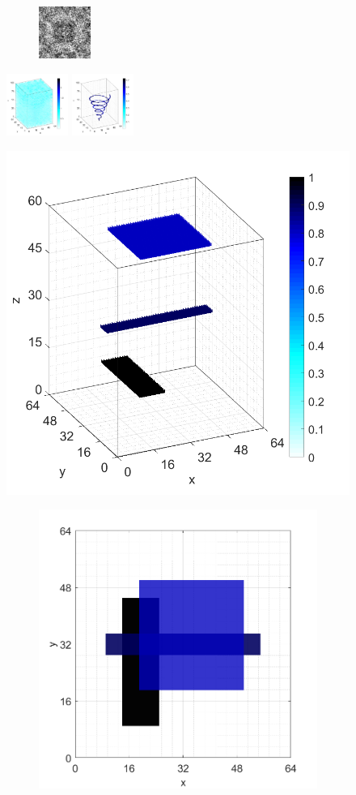 \documentclass[9pt,twocolumn,twoside]{osajnl}
\begin{document}
\begin{figure}[htbp]
\begin{minipage}[b]{1\textwidth}
\begin{subfigure}[b]{0.18\textwidth}
  \includegraphics[width=0.45\columnwidth]{conhelix_complex_holo}
\end{subfigure}
\includegraphics[width=0.18\textwidth]{conhelix_complex_BP_3d}
\includegraphics[width=0.18\textwidth]{conhelix_complex_TwIST_3d}
\subcaption{}
\end{minipage}

\begin{minipage}[b]{1\textwidth}
\centering
\includegraphics[width=0.18\columnwidth]{overlap}
\begin{subfigure}[b]{0.18\textwidth}
  \centering
  \includegraphics[width=0.45\columnwidth]{overlap_top}


\end{subfigure}
\end{minipage}
\end{figure}
\end{document}
